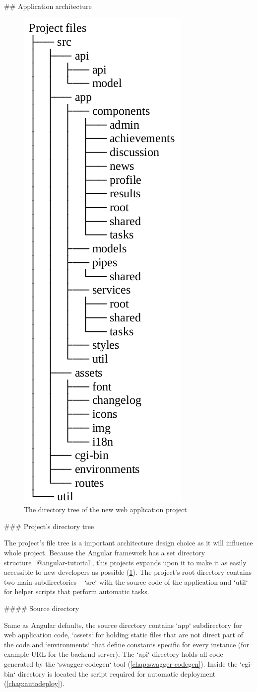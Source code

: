 \documentclass[
  digital, %
  oneside, %
  lof,     %
  lot,     %
]{fithesis4}
\begin{document}
{

## Application architecture

\begin{figure}
\includegraphics[width=.3\textwidth]{assets/img/file-tree}
\caption{The directory tree of the new web application project}
\label{fig:file-tree}
\end{figure}

### Project's directory tree

The project's file tree is a important architecture design choice as it will influence whole project. Because the Angular framework has a set directory structure~[@angular-tutorial], this projects expands upon it to make it as easily accessible to new developers as possible (\ref{fig:file-tree}). The project's root directory contains two main subdirectories -- `src` with the source code of the application and `util` for helper scripts that perform automatic tasks.

#### Source directory

Same as Angular defaults, the source directory contains `app` subdirectory for web application code, `assets` for holding static files that are not direct part of the code and `environments` that define constants specific for every instance (for example URL for the backend server). The `api` directory holds all code generated by the `swagger-codegen` tool (\autoref{chap:swagger-codegen}). Inside the `cgi-bin` directory is located the script required for automatic deployment (\autoref{chap:autodeploy}).

}
\end{document}
